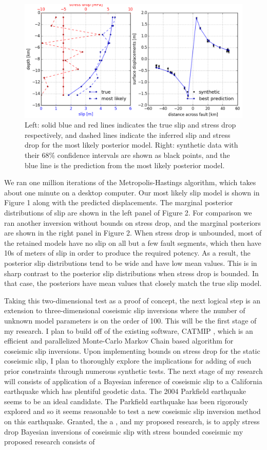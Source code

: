 \documentclass[12pt]{article}
\begin{document}
\begin{figure}
\includegraphics[width=1.0\textwidth]{figure_1}
\caption{Left: solid blue and red lines indicates the true slip and stress drop respectively, and dashed lines indicate the inferred slip and stress drop for the most likely posterior model.  Right: synthetic data with their 68\% confidence intervals are shown as black points, and the blue line is the prediction from the most likely posterior model.}  
\end{figure}

We ran one million iterations of the Metropolis-Hastings algorithm, which takes about one minute on a desktop computer.  Our most likely slip model is shown in Figure 1 along with the predicted displacements.  The marginal posterior distributions of slip are shown in the left panel of Figure 2.  For comparison we ran another inversion without bounds on stress drop, and the marginal posteriors are shown in the right panel in Figure 2.  When stress drop is unbounded, most of the retained models have no slip on all but a few fault segments, which then have 10s of meters of slip in order to produce the required potency.  As a result, the posterior slip distributions tend to be wide and have low mean values.  This is in sharp contrast to the posterior slip distributions when stress drop is bounded.  In that case, the posteriors have mean values that closely match the true slip model.   

Taking this two-dimensional test as a proof of concept, the next logical step is an extension to three-dimensional coseismic slip inversions where the number of unknown model parameters is on the order of 100.  This will be the first stage of my research.  I plan to build off of the existing software, CATMIP \cite{Minson2013}, which is an efficient and parallelized Monte-Carlo Markov Chain based algorithm for coseismic slip inversions.  Upon implementing bounds on stress drop for the static coseismic slip, I plan to thoroughly explore the implications for adding of such prior constraints through numerous synthetic tests.  The next stage of my research will consists of application of a Bayesian inference of coseismic slip to a California earthquake which has plentiful geodetic data.  The 2004 Parkfield earthquake seems to be an ideal candidate.  The Parkfield earthquake has been rigorously explored and so it seems reasonable to test a new coseismic slip inversion method on this earthquake.  Granted, the   a , and my proposed research, is to apply stress drop  Bayesian inversions of coseismic slip with stress bounded coseismic my proposed research consists of  
\end{document}

